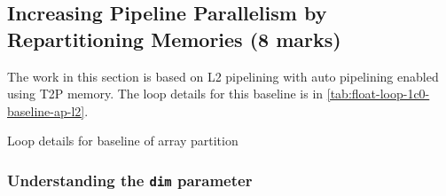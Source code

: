 \subsection{Increasing Pipeline Parallelism by Repartitioning Memories (8 marks)}\label{sec:1c}

The work in this section is based on L2 pipelining with auto pipelining enabled using T2P memory.
The loop details for this baseline is in \autoref{tab:float-loop-1c0-baseline-ap-l2}.

\begin{table}[ht!]
    \caption{Loop details for baseline of array partition}
    \label{tab:float-loop-1c0-baseline-ap-l2}
    \centering
    
\end{table}


\subsubsection{Understanding the \texttt{dim} parameter}\label{sec:1cDim}




